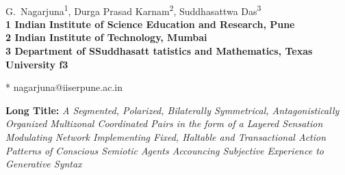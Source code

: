 \documentclass[10pt,letterpaper]{article}
\begin{document}
\vspace*{0.35in}

\begin{flushleft}
{\Large
\textbf{}
}
\newline
\\
G.~Nagarjuna\textsuperscript{1},
Durga Prasad Karnam\textsuperscript{2},
Suddhasattwa Das\textsuperscript{3}
\\
\bigskip
\bf{1} Indian Institute of Science Education and Research, Pune
\\
\bf{2} Indian Institute of Technology, Mumbai
\\
\bf{3} Department of SSuddhasatt
tatistics and Mathematics, Texas University
f{3} 

\bigskip
* nagarjuna@iiserpune.ac.in

\end{flushleft}
\noindent \textbf{Long Title:} \textit{A Segmented, Polarized,
  Bilaterally Symmetrical, Antagonistically Organized Multizonal
  Coordinated Pairs in the form of a Layered Sensation Modulating
  Network Implementing Fixed, Haltable and Transactional Action
  Patterns of Conscious Semiotic Agents Accouncing Subjective
  Experience to Generative Syntax}













\end{document}
